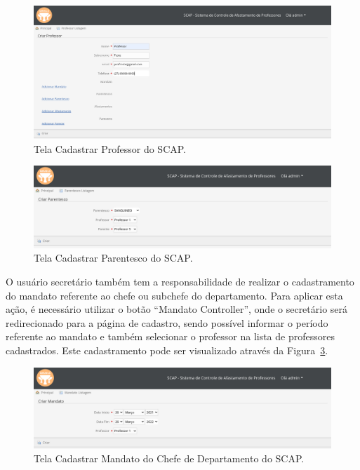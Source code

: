 \begin{figure}[!h]
	\centering
	\includegraphics[scale=0.33]{figuras/fig-projeto-cadastrar-professor} 
	\caption{Tela Cadastrar Professor do SCAP.}
	\label{fig-projeto-cadastrar-professor}
\end{figure}

\begin{figure}[!h]
	\centering
	\includegraphics[scale=0.33]{figuras/fig-projeto-cadastrar-parentesco} 
	\caption{Tela Cadastrar Parentesco do SCAP.}
	\label{fig-projeto-cadastrar-parentesco}
\end{figure}

O usuário secretário também tem a responsabilidade de realizar o cadastramento do mandato referente ao chefe ou subchefe do departamento. Para aplicar esta ação, é necessário utilizar o botão ``Mandato Controller'', onde o secretário será redirecionado para a página de cadastro, sendo possível informar o período referente ao mandato e também selecionar o professor na lista de professores cadastrados. Este cadastramento pode ser visualizado através da Figura~\ref{fig-projeto-cadastrar-mandato}. 

\begin{figure}[!h]
	\centering
	\includegraphics[scale=0.33]{figuras/fig-projeto-cadastrar-mandato} 
	\caption{Tela Cadastrar Mandato do Chefe de Departamento do SCAP.}
	\label{fig-projeto-cadastrar-mandato}
\end{figure}

